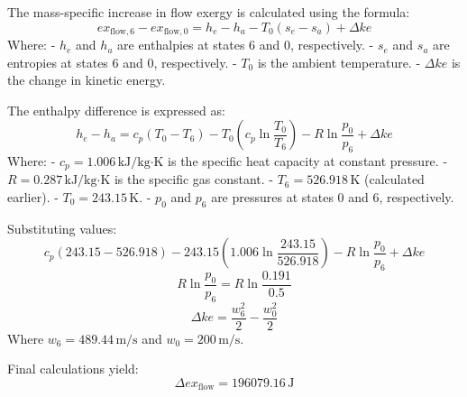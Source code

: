 The mass-specific increase in flow exergy is calculated using the formula:  
\[
ex_{\text{flow},6} - ex_{\text{flow},0} = h_e - h_a - T_0(s_e - s_a) + \Delta ke
\]  
Where:  
- \( h_e \) and \( h_a \) are enthalpies at states 6 and 0, respectively.  
- \( s_e \) and \( s_a \) are entropies at states 6 and 0, respectively.  
- \( T_0 \) is the ambient temperature.  
- \( \Delta ke \) is the change in kinetic energy.

The enthalpy difference is expressed as:  
\[
h_e - h_a = c_p(T_0 - T_6) - T_0 \left( c_p \ln \frac{T_0}{T_6} \right) - R \ln \frac{p_0}{p_6} + \Delta ke
\]  
Where:  
- \( c_p = 1.006 \, \text{kJ/kg·K} \) is the specific heat capacity at constant pressure.  
- \( R = 0.287 \, \text{kJ/kg·K} \) is the specific gas constant.  
- \( T_6 = 526.918 \, \text{K} \) (calculated earlier).  
- \( T_0 = 243.15 \, \text{K} \).  
- \( p_0 \) and \( p_6 \) are pressures at states 0 and 6, respectively.  

Substituting values:  
\[
c_p(243.15 - 526.918) - 243.15 \left( 1.006 \ln \frac{243.15}{526.918} \right) - R \ln \frac{p_0}{p_6} + \Delta ke
\]  
\[
R \ln \frac{p_0}{p_6} = R \ln \frac{0.191}{0.5}
\]  
\[
\Delta ke = \frac{w_6^2}{2} - \frac{w_0^2}{2}
\]  
Where \( w_6 = 489.44 \, \text{m/s} \) and \( w_0 = 200 \, \text{m/s} \).  

Final calculations yield:  
\[
\Delta ex_{\text{flow}} = 196079.16 \, \text{J}
\]